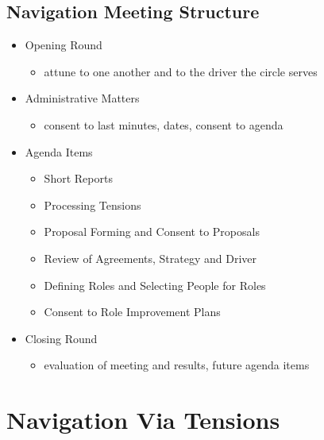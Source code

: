 \subsection{Navigation Meeting Structure}
\label{navigationmeetingstructure}

\begin{itemize}
\item Opening Round

\begin{itemize}
\item attune to one another and to the driver the circle serves

\end{itemize}

\item Administrative Matters

\begin{itemize}
\item consent to last minutes, dates, consent to agenda

\end{itemize}

\item Agenda Items

\begin{itemize}
\item Short Reports

\item Processing Tensions

\item Proposal Forming and Consent to Proposals

\item Review of Agreements, Strategy and Driver

\item Defining Roles and Selecting People for Roles

\item Consent to Role Improvement Plans

\end{itemize}

\item Closing Round

\begin{itemize}
\item evaluation of meeting and results, future agenda items

\end{itemize}

\end{itemize}

\section{Navigation Via Tensions}
\label{navigationviatensions}

